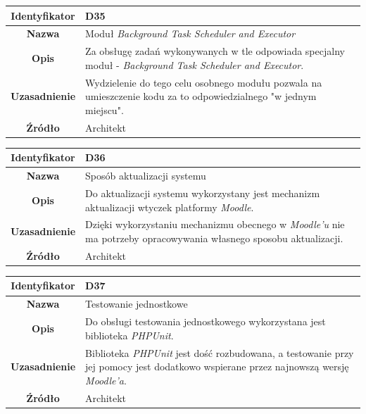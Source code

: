 \begin{table}[H]
\centering
\begin{tabular}{ | >{\bfseries}c | p{11cm} | }
\hline
%
Identyfikator & D35 \\ \hline
Nazwa & Moduł \textit{Background Task Scheduler and Executor} \\ \hline
Opis & Za obsługę zadań wykonywanych w tle odpowiada specjalny moduł - \textit{Background Task Scheduler and Executor}. \\ \hline
Uzasadnienie & Wydzielenie do tego celu osobnego modułu pozwala na umieszczenie kodu za to odpowiedzialnego "w jednym miejscu". \\ \hline
Źródło & Architekt \\ \hline
%
\end{tabular}
\end{table}

\begin{table}[H]
\centering
\begin{tabular}{ | >{\bfseries}c | p{11cm} | }
\hline
%
Identyfikator & D36 \\ \hline
Nazwa & Sposób aktualizacji systemu \\ \hline
Opis & Do aktualizacji systemu wykorzystany jest mechanizm aktualizacji wtyczek platformy \textit{Moodle}. \\ \hline
Uzasadnienie & Dzięki wykorzystaniu mechanizmu obecnego w \textit{Moodle'u} nie ma potrzeby opracowywania własnego sposobu aktualizacji. \\ \hline
Źródło & Architekt \\ \hline
%
\end{tabular}
\end{table}

\begin{table}[H]
\centering
\begin{tabular}{ | >{\bfseries}c | p{11cm} | }
\hline
%
Identyfikator & D37 \\ \hline
Nazwa & Testowanie jednostkowe \\ \hline
Opis & Do obsługi testowania jednostkowego wykorzystana jest biblioteka \textit{PHPUnit}.  \\ \hline
Uzasadnienie & Biblioteka \textit{PHPUnit} jest dość rozbudowana, a testowanie przy jej pomocy jest dodatkowo wspierane przez najnowszą wersję \textit{Moodle'a}. \\ \hline
Źródło & Architekt \\ \hline
%
\end{tabular}
\end{table}


